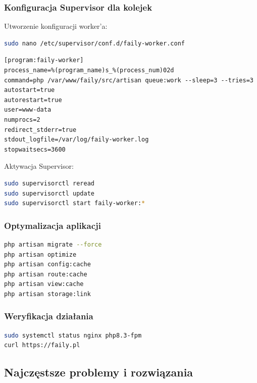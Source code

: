 \documentclass[12pt,a4paper]{article}
\begin{document}
\subsubsection{Konfiguracja Supervisor dla kolejek}

Utworzenie konfiguracji worker'a:
\begin{lstlisting}[language=bash, caption=Konfiguracja Supervisor]
sudo nano /etc/supervisor/conf.d/faily-worker.conf
\end{lstlisting}

\begin{lstlisting}[caption=Konfiguracja Laravel worker]
[program:faily-worker]
process_name=%(program_name)s_%(process_num)02d
command=php /var/www/faily/src/artisan queue:work --sleep=3 --tries=3
autostart=true
autorestart=true
user=www-data
numprocs=2
redirect_stderr=true
stdout_logfile=/var/log/faily-worker.log
stopwaitsecs=3600
\end{lstlisting}

Aktywacja Supervisor:
\begin{lstlisting}[language=bash, caption=Uruchomienie worker'a]
sudo supervisorctl reread
sudo supervisorctl update
sudo supervisorctl start faily-worker:*
\end{lstlisting}

\subsubsection{Optymalizacja aplikacji}
\begin{lstlisting}[language=bash, caption=Optymalizacja Laravel]
php artisan migrate --force
php artisan optimize
php artisan config:cache
php artisan route:cache
php artisan view:cache
php artisan storage:link
\end{lstlisting}

\subsubsection{Weryfikacja działania}
\begin{lstlisting}[language=bash, caption=Sprawdzenie statusu usług]
sudo systemctl status nginx php8.3-fpm
curl https://faily.pl
\end{lstlisting}

\subsection{Najczęstsze problemy i rozwiązania}
\end{document}
